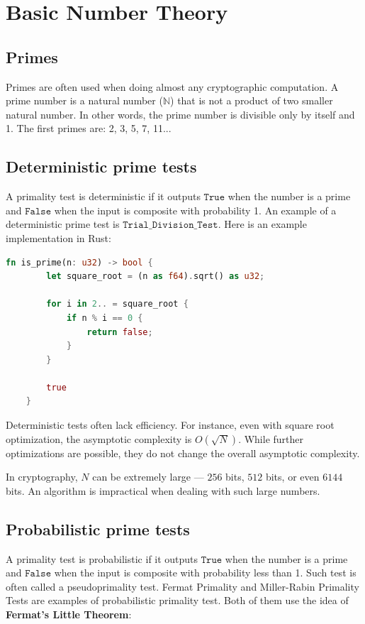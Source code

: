 \documentclass[../lecture-notes.tex]{subfiles}
\begin{document}
\section{Basic Number Theory}

\subsection{Primes}

Primes are often used when doing almost any cryptographic computation. A prime number is a natural number ($\mathbb{N}$) that is not a product
of two smaller natural number. In other words, the prime number is divisible only by itself and 1. The first primes are: 2, 3, 5, 7, 11...

\subsection{Deterministic prime tests}

A primality test is deterministic if it outputs $\mathtt{True}$ when the number is a prime and $\mathtt{False}$ when the input is composite with probability 1.
An example of a deterministic prime test is $\mathtt{Trial\_Division\_Test}$. Here is an example implementation in Rust: 

\begin{lstlisting}[language=Rust]
    fn is_prime(n: u32) -> bool {
        let square_root = (n as f64).sqrt() as u32;

        for i in 2.. = square_root {
            if n % i == 0 {
                return false;
            }
        }

        true
    }
\end{lstlisting}

Deterministic tests often lack efficiency. For instance, even with square root optimization, the asymptotic complexity is $O(\sqrt{N})$. 
While further optimizations are possible, they do not change the overall asymptotic complexity.

In cryptography, $N$ can be extremely large — $256$ bits, $512$ bits, or even $6144$ bits. 
An algorithm is impractical when dealing with such large numbers.

\subsection{Probabilistic prime tests}

A primality test is probabilistic if it outputs $\mathtt{True}$ when the number is a prime and $\mathtt{False}$ when the input is composite with probability less than 1. Such test is often called a pseudoprimality test.
Fermat Primality and Miller-Rabin Primality Tests are examples of probabilistic primality test. Both of them use the idea of \textbf{Fermat's Little Theorem}:
\end{document}
